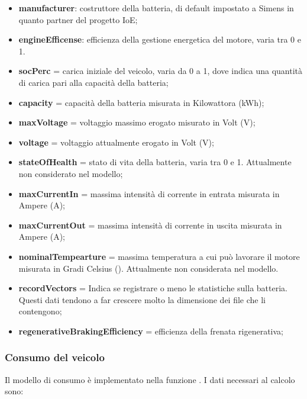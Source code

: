 \begin{itemize}
	\item \textbf{manufacturer}: costruttore della batteria, di default impostato a Simens in quanto partner del progetto IoE;
	\item \textbf{engineEfficense}: efficienza della gestione energetica del motore, varia tra 0 e 1.
	\item \textbf{socPerc} =  carica iniziale del veicolo, varia da 0 a 1, dove indica una quantità di carica pari alla capacità della batteria;
    \item \textbf{capacity} = capacità della batteria misurata in Kilowattora (kWh);
    \item \textbf{maxVoltage} = voltaggio massimo erogato misurato in Volt (V);
    \item \textbf{voltage} = voltaggio attualmente erogato  in Volt (V);
    \item \textbf{stateOfHealth} = stato di vita della batteria, varia tra 0 e 1. Attualmente non considerato nel modello;
    \item \textbf{maxCurrentIn} = massima intensità di corrente in entrata misurata in Ampere (A);
    \item \textbf{maxCurrentOut} = massima intensità di corrente in uscita misurata in Ampere (A);
    \item \textbf{nominalTempearture} = massima temperatura a cui può lavorare il motore misurata in Gradi Celsius (\textcelsius). Attualmente non considerata nel modello.
    \item \textbf{recordVectors} = Indica se registrare o meno le statistiche sulla batteria. Questi dati tendono a far crescere molto la dimensione dei file che li contengono;
    \item \textbf{regenerativeBrakingEfficiency} = efficienza della frenata rigenerativa;
\end{itemize}

\subsubsection{Consumo del veicolo}

Il modello di consumo è implementato nella funzione . I dati necessari al calcolo sono: 

